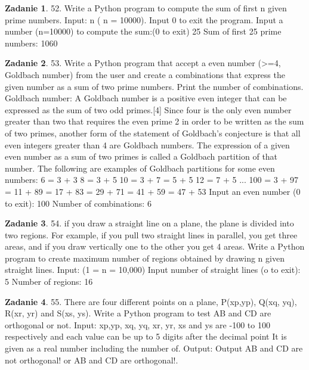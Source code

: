 \documentclass[11pt]{article}
\theoremstyle{definition}
\newtheorem{zadanie}{Zadanie}
\begin{document}
\begin{zadanie}
52. Write a Python program to compute the sum of first n given prime numbers.
Input:
n ( n = 10000). Input 0 to exit the program.
Input a number (n=10000) to compute the sum:(0 to exit)
25
Sum of first 25 prime numbers:
1060
\end{zadanie}

\begin{zadanie}
53. Write a Python program that accept a even number (>=4, Goldbach number) from the user and create a combinations that express the given number as a sum of two prime numbers. Print the number of combinations.
Goldbach number: A Goldbach number is a positive even integer that can be expressed as the sum of two odd primes.[4] Since four is the only even number greater than two that requires the even prime 2 in order to be written as the sum of two primes, another form of the statement of Goldbach's conjecture is that all even integers greater than 4 are Goldbach numbers.
The expression of a given even number as a sum of two primes is called a Goldbach partition of that number. The following are examples of Goldbach partitions for some even numbers:
6 = 3 + 3
8 = 3 + 5
10 = 3 + 7 = 5 + 5
12 = 7 + 5
...
100 = 3 + 97 = 11 + 89 = 17 + 83 = 29 + 71 = 41 + 59 = 47 + 53
Input an even number (0 to exit):
100
Number of combinations:
6
\end{zadanie}

\begin{zadanie}
54. if you draw a straight line on a plane, the plane is divided into two regions. For example, if you pull two straight lines in parallel, you get three areas, and if you draw vertically one to the other you get 4 areas.
Write a Python program to create maximum number of regions obtained by drawing n given straight lines.
Input:
(1 = n = 10,000)
Input number of straight lines (o to exit):
5
Number of regions:
16
\end{zadanie}

\begin{zadanie}
55. There are four different points on a plane, P(xp,yp), Q(xq, yq), R(xr, yr) and S(xs, ys). Write a Python program to test AB and CD are orthogonal or not.
Input:
xp,yp, xq, yq, xr, yr, xs and ys are -100 to 100 respectively and each value can be up to 5 digits after the decimal point It is given as a real number including the number of. Output:
Output AB and CD are not orthogonal! or AB and CD are orthogonal!.
\end{zadanie}
\end{document}
